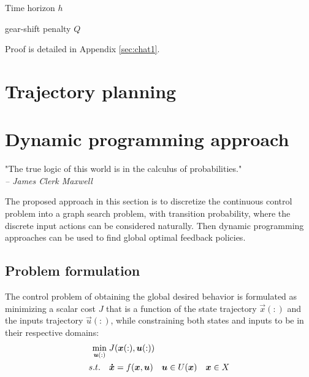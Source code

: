 Time horizon $h$

gear-shift penalty $Q$


Proof is detailed in Appendix \ref{sec:chat1}.







\newpage
\section{Trajectory planning}
\label{sec:SamplingBasedTrajectoryPlanner}




\newpage

\section{Dynamic programming approach}
\label{sec:DynamicProgrammingAproach}

\begin{flushright}
\small"The true logic of this world is in the calculus of probabilities." \\ \emph{-- James Clerk Maxwell}
\end{flushright}

The proposed approach in this section is to discretize the continuous control problem into a graph search problem, with transition probability, where the discrete input actions can be considered naturally. Then dynamic programming approaches can be used to find global optimal feedback policies. 


\subsection{Problem formulation}

The control problem of obtaining the global desired behavior is formulated as minimizing a scalar cost $J$ that is a function of the state trajectory $\vec{x}(:)$ and the inputs trajectory $\vec{u}(:)$, while constraining both states and inputs to be in their respective domains:
\begin{align}
	\operatornamewithlimits{min}\limits_{\vec{u}(:)} \; & J(\vec{x}(:),\vec{u}(:)) \\
	s.t. \quad & \vec{\dot{x}} = f(\vec{x}, \vec{u}) \quad \vec{u} \in U(\vec{x}) \quad \vec{x} \in X 
	\label{eq:min}
\end{align}


